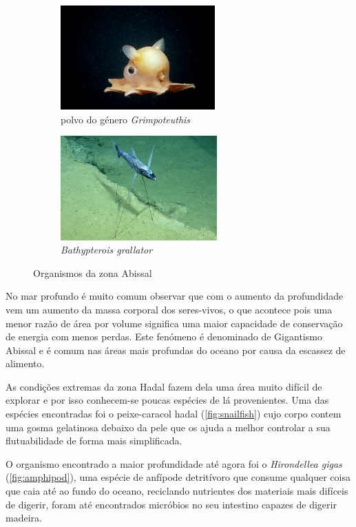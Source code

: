 \documentclass{report}
\begin{document}
\begin{figure}[H]
\center
    \begin{subfigure}{.5\textwidth}
    \center
        \includegraphics[height=4cm]{imagens/polvodumbo.jpg}
        \caption{polvo do género \textit{Grimpoteuthis}}
        \label{fig:polvodumbo}
    \end{subfigure}%
    \begin{subfigure}{.5\textwidth}
    \center
        \includegraphics[height=4cm]{imagens/tripodfish.jpg}
        \caption{\textit{Bathypterois grallator}}
        \label{fig:peixetripe}
    \end{subfigure}
    \caption{Organismos da zona Abissal}
    \label{fig:peixesAbiss}
\end{figure}

No mar profundo é muito comum observar que com o aumento da profundidade vem um aumento da massa corporal dos seres-vivos, o que acontece pois uma menor razão de área por volume significa uma maior capacidade de conservação de energia com menos perdas. Este fenómeno é denominado de Gigantismo Abissal e é comum nas áreas mais profundas do oceano por causa da escassez de alimento.

As condições extremas da zona Hadal fazem dela uma área muito difícil de explorar e por isso conhecem-se poucas espécies de lá provenientes. Uma das espécies encontradas foi o peixe-caracol hadal (\ref{fig:snailfish}) cujo corpo contem uma gosma gelatinosa debaixo da pele que os ajuda a melhor controlar a sua flutuabilidade de forma mais simplificada.

O organismo encontrado a maior profundidade até agora foi o \textit{Hirondellea gigas} (\ref{fig:amphipod}), uma espécie de anfípode detritívoro que consume qualquer coisa que caia até ao fundo do oceano, reciclando nutrientes dos materiais mais difíceis de digerir, foram até encontrados micróbios no seu intestino capazes de digerir madeira.
\end{document}
